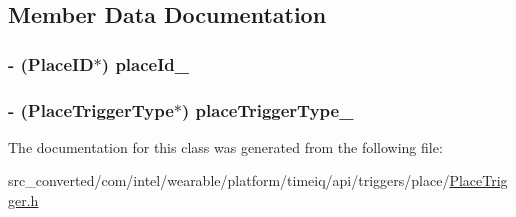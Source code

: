 \subsection{Member Data Documentation}
\hypertarget{interface_place_trigger___place_trigger_builder_ad182131b179767343c9e1124bfdbca6b}{}
\subsubsection[{place\+Id\+\_\+}]{\setlength{\rightskip}{0pt plus 5cm}-\/ (Place\+I\+D$\ast$) place\+Id\+\_\+}\label{interface_place_trigger___place_trigger_builder_ad182131b179767343c9e1124bfdbca6b}
\hypertarget{interface_place_trigger___place_trigger_builder_ad9a4e7257b8c8d111d7c903d87af6e11}{}
\subsubsection[{place\+Trigger\+Type\+\_\+}]{\setlength{\rightskip}{0pt plus 5cm}-\/ ({\bf Place\+Trigger\+Type}$\ast$) place\+Trigger\+Type\+\_\+}\label{interface_place_trigger___place_trigger_builder_ad9a4e7257b8c8d111d7c903d87af6e11}


The documentation for this class was generated from the following file\+:\begin{DoxyCompactItemize}
\item 
src\+\_\+converted/com/intel/wearable/platform/timeiq/api/triggers/place/\hyperlink{_place_trigger_8h}{Place\+Trigger.\+h}\end{DoxyCompactItemize}
